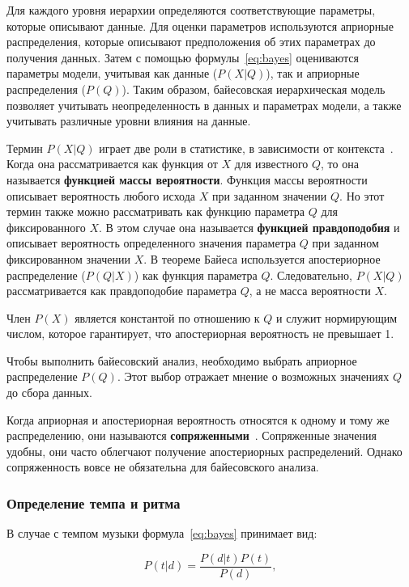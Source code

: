 Для каждого уровня иерархии определяются соответствующие параметры, которые описывают данные. Для оценки параметров используются априорные распределения, которые описывают предположения об этих параметрах до получения данных. Затем с помощью формулы~\ref{eq:bayes} оцениваются параметры модели, учитывая как данные ($P(X|Q)$), так и априорные распределения ($P(Q)$). Таким образом, байесовская иерархическая модель позволяет учитывать неопределенность в данных и параметрах модели, а также учитывать различные уровни влияния на данные.

Термин $P(X|Q)$ играет две роли в статистике, в зависимости от контекста~\cite{bayes_hier}. Когда она рассматривается как функция от $X$ для известного $Q$, то она называется \textbf{функцией массы вероятности}. Функция массы вероятности описывает вероятность любого исхода $X$ при заданном значении $Q$. Но этот термин также можно рассматривать как функцию параметра $Q$ для фиксированного $X$. В этом случае она называется \textbf{функцией правдоподобия} и описывает вероятность определенного значения параметра $Q$ при заданном фиксированном значении $X$. В теореме Байеса используется апостериорное распределение ($P(Q|X)$) как функция параметра $Q$. Следовательно, $P(X|Q)$ рассматривается как правдоподобие параметра $Q$, а не масса вероятности $X$.

Член $P(X)$ является константой по отношению к $Q$ и служит нормирующим числом, которое гарантирует, что апостериорная вероятность не превышает 1.

Чтобы выполнить байесовский анализ, необходимо выбрать априорное распределение $P(Q)$. Этот выбор отражает мнение о возможных значениях $Q$ до сбора данных.

Когда априорная и апостериорная вероятность относятся к одному и тому же распределению, они называются \textbf{сопряженными}~\cite{bayes_hier}. Сопряженные значения удобны, они часто облегчают получение апостериорных распределений. Однако сопряженность вовсе не обязательна для байесовского анализа.

\subsubsection{Определение темпа и ритма}

В случае с темпом музыки формула~\ref{eq:bayes} принимает вид:

\begin{equation}\label{eq:bayes_tempo}
	P(t|d) = \frac{P(d|t)P(t)}{P(d)},
\end{equation}

